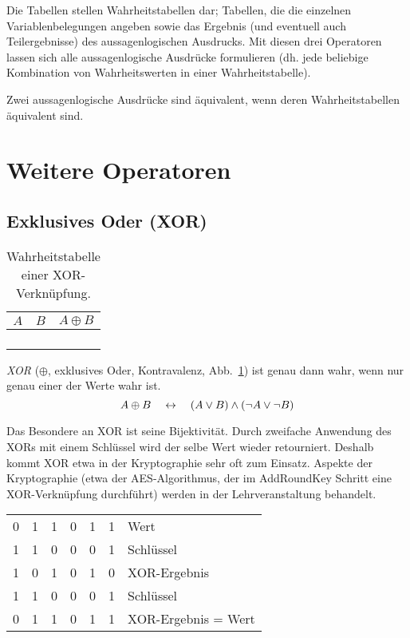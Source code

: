 Die Tabellen stellen Wahrheitstabellen dar; Tabellen, die die einzelnen Variablenbelegungen angeben sowie das Ergebnis (und eventuell auch Teilergebnisse) des aussagenlogischen Ausdrucks. Mit diesen drei Operatoren lassen sich alle aussagenlogische Ausdrücke formulieren (dh. jede beliebige Kombination von Wahrheitswerten in einer Wahrheitstabelle).

Zwei aussagenlogische Ausdrücke sind äquivalent, wenn deren Wahrheitstabellen äquivalent sind.
%
\section{Weitere Operatoren}
%
\subsection{Exklusives Oder (XOR)}
%
\begin{table}[ht]
 \begin{center}
  \begin{tabular}{cc|c}
   \hline
    $A$ & $B$ & $A \oplus{} B$ \\
   \hline \hline
    \F  & \F  & \F \\
    \F  & \T  & \T \\
    \T  & \F  & \T \\
    \T  & \T  & \F \\
  \end{tabular}
  \caption{Wahrheitstabelle einer XOR-Verknüpfung.}
  \label{fig:xor_operator}
 \end{center}
\end{table}
%
\emph{XOR} ($\oplus$, exklusives Oder, Kontravalenz, Abb.~\ref{fig:xor_operator}) ist genau dann wahr, wenn nur genau einer der Werte wahr ist.
\[
  A \oplus B \quad\leftrightarrow\quad (A \lor B) \land (\neg A \lor \neg B)
\]

Das Besondere an XOR ist seine Bijektivität. Durch zweifache Anwendung des XORs mit einem Schlüssel wird der selbe Wert wieder retourniert. Deshalb kommt XOR etwa in der Kryptographie sehr oft zum Einsatz. Aspekte der Kryptographie (etwa der AES-Algorithmus, der im AddRoundKey Schritt eine XOR-Verknüpfung durchführt) werden in der Lehrveranstaltung \courseiis{} behandelt.
%
\begin{table}[ht]
  \begin{center}
    \begin{tabular}{cccccc|l}
      0&1&1&0&1&1& Wert \\
      1&1&0&0&0&1& Schlüssel \\
    \hline
      1&0&1&0&1&0& XOR-Ergebnis \\
      1&1&0&0&0&1& Schlüssel \\
    \hline
      0&1&1&0&1&1& XOR-Ergebnis = Wert
    \end{tabular}
  \end{center}
\end{table}

